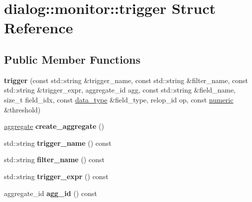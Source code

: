 \hypertarget{structdialog_1_1monitor_1_1trigger}{}\section{dialog\+:\+:monitor\+:\+:trigger Struct Reference}
\label{structdialog_1_1monitor_1_1trigger}
\subsection*{Public Member Functions}
\begin{DoxyCompactItemize}
\item 
\mbox{\label{structdialog_1_1monitor_1_1trigger_a47a107ae96c7562efc4dc6a6bfd8de2d}} 
{\bfseries trigger} (const std\+::string \&trigger\+\_\+name, const std\+::string \&filter\+\_\+name, const std\+::string \&trigger\+\_\+expr, aggregate\+\_\+id agg, const std\+::string \&field\+\_\+name, size\+\_\+t field\+\_\+idx, const \hyperlink{structdialog_1_1data__type}{data\+\_\+type} \&field\+\_\+type, relop\+\_\+id op, const \hyperlink{classdialog_1_1numeric}{numeric} \&threshold)
\item 
\mbox{\label{structdialog_1_1monitor_1_1trigger_ab601fa72f197b4a443b49f1ff848d9b0}} 
\hyperlink{classdialog_1_1aggregate}{aggregate} {\bfseries create\+\_\+aggregate} ()
\item 
\mbox{\label{structdialog_1_1monitor_1_1trigger_a98592f07ce3e456fb8f0cc390eaec834}} 
std\+::string {\bfseries trigger\+\_\+name} () const
\item 
\mbox{\label{structdialog_1_1monitor_1_1trigger_acdb506aaddd9c81cb214c61ccd26029d}} 
std\+::string {\bfseries filter\+\_\+name} () const
\item 
\mbox{\label{structdialog_1_1monitor_1_1trigger_afd91382a9a9819faba0b5c725f1c75e4}} 
std\+::string {\bfseries trigger\+\_\+expr} () const
\item 
\mbox{\label{structdialog_1_1monitor_1_1trigger_a6160169b3d1637d1b749b3691d6e305b}} 
aggregate\+\_\+id {\bfseries agg\+\_\+id} () const

\end{DoxyCompactItemize}
